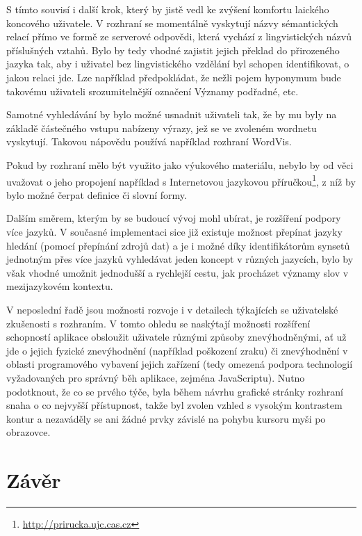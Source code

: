 \documentclass[a4paper, 11pt, oneside]{book}
\newcommand\ex{\textsf}
\begin{document}
			S tímto souvisí i další krok, který by jistě vedl ke zvýšení komfortu laického koncového uživatele. V rozhraní se momentálně vyskytují názvy sémantických relací přímo ve formě ze serverové odpovědi, která vychází z lingvistických názvů příslušných vztahů. Bylo by tedy vhodné zajistit jejich překlad do přirozeného jazyka tak, aby i uživatel bez lingvistického vzdělání byl schopen identifikovat, o jakou relaci jde. Lze například předpokládat, že nežli pojem \ex{hyponymum} bude takovému uživateli srozumitelnější označení \ex{Významy podřadné}, etc.

			Samotné vyhledávání by bylo možné usnadnit uživateli tak, že by mu byly na základě částečného vstupu nabízeny výrazy, jež se ve zvoleném wordnetu vyskytují. Takovou nápovědu používá například rozhraní WordVis. \parencite{wordvis2010vercruysse}

			Pokud by rozhraní mělo být využito jako výukového materiálu, nebylo by od věci uvažovat o jeho propojení například s Internetovou jazykovou příručkou\footnote{\url{http://prirucka.ujc.cas.cz}}, z níž by bylo možné čerpat definice či slovní formy.

			Dalším směrem, kterým by se budoucí vývoj mohl ubírat, je rozšíření podpory více jazyků. V současné implementaci sice již existuje možnost přepínat jazyky hledání (pomocí přepínání zdrojů dat) a je i možné díky identifikátorům synsetů jednotným přes více jazyků vyhledávat jeden koncept v různých jazycích, bylo by však vhodné umožnit jednodušší a rychlejší cestu, jak procházet významy slov v mezijazykovém kontextu.

			V neposlední řadě jsou možnosti rozvoje i v detailech týkajících se uživatelské zkušenosti s rozhraním. V tomto ohledu se naskýtají možnosti rozšíření schopností aplikace obsloužit uživatele různými způsoby znevýhodněnými, ať už jde o jejich fyzické znevýhodnění (například poškození zraku) či znevýhodnění v oblasti programového vybavení jejich zařízení (tedy omezená podpora technologií vyžadovaných pro správný běh aplikace, zejména JavaScriptu). Nutno podotknout, že co se prvého týče, byla během návrhu grafické stránky rozhraní snaha o co nejvyšší přístupnost, takže byl zvolen vzhled s vysokým kontrastem kontur a nezaváděly se ani žádné prvky závislé na pohybu kursoru myši po obrazovce. 

		\chapter*{Závěr}\label{zaver}
\end{document}
